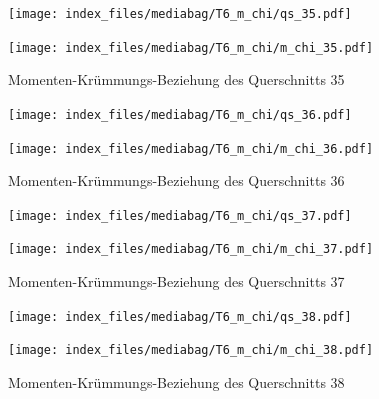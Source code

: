 \documentclass[
  11pt,
  letterpaper,
]{scrreprt}
\begin{document}
\begin{figure}[H]

\begin{minipage}{0.50\linewidth}
\texttt{[image: index\_files/mediabag/T6\_m\_chi/qs\_35.pdf]}\end{minipage}%
%
\begin{minipage}{0.50\linewidth}
\texttt{[image: index\_files/mediabag/T6\_m\_chi/m\_chi\_35.pdf]}\end{minipage}%

\caption{\label{fig-mchi_anhang}Momenten-Krümmungs-Beziehung des
Querschnitts 35}

\end{figure}%

\begin{figure}[H]

\begin{minipage}{0.50\linewidth}
\texttt{[image: index\_files/mediabag/T6\_m\_chi/qs\_36.pdf]}\end{minipage}%
%
\begin{minipage}{0.50\linewidth}
\texttt{[image: index\_files/mediabag/T6\_m\_chi/m\_chi\_36.pdf]}\end{minipage}%

\caption{\label{fig-mchi_anhang}Momenten-Krümmungs-Beziehung des
Querschnitts 36}

\end{figure}%

\begin{figure}[H]

\begin{minipage}{0.50\linewidth}
\texttt{[image: index\_files/mediabag/T6\_m\_chi/qs\_37.pdf]}\end{minipage}%
%
\begin{minipage}{0.50\linewidth}
\texttt{[image: index\_files/mediabag/T6\_m\_chi/m\_chi\_37.pdf]}\end{minipage}%

\caption{\label{fig-mchi_anhang}Momenten-Krümmungs-Beziehung des
Querschnitts 37}

\end{figure}%

\begin{figure}[H]

\begin{minipage}{0.50\linewidth}
\texttt{[image: index\_files/mediabag/T6\_m\_chi/qs\_38.pdf]}\end{minipage}%
%
\begin{minipage}{0.50\linewidth}
\texttt{[image: index\_files/mediabag/T6\_m\_chi/m\_chi\_38.pdf]}\end{minipage}%

\caption{\label{fig-mchi_anhang}Momenten-Krümmungs-Beziehung des
Querschnitts 38}

\end{figure}%
\end{document}
